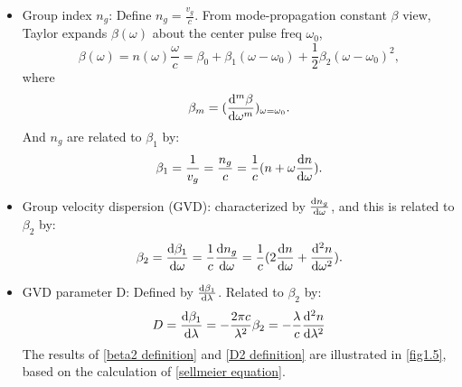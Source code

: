 \documentclass[12pt]{extarticle}
\numberwithin{equation}{section}
\numberwithin{figure}{section}
\numberwithin{table}{section}
\newcommand{\<}{\langle}
\renewcommand{\>}{\rangle}
\theoremstyle{definition}
\begin{document}
\begin{itemize}
                \item Group index $n_g$: Define $n_g = \frac{v_g}{c}$. From mode-propagation constant $\beta$ view, Taylor expands $\beta(\omega)$ about the center pulse freq $\omega_0$, 
                    \begin{equation}
                        \beta(\omega) = n(\omega)\frac{\omega}{c}=\beta_0 + \beta_1(\omega-\omega_0)+\frac{1}{2}\beta_2(\omega-\omega_0)^2,
                        \label{propagation constant expansion}
                    \end{equation}
                    where
                    \begin{equation}
                        \beta_m = (\dv[m]{\beta}{\omega})_{\omega=\omega_0}.
                        \label{betam definition}
                    \end{equation}
                    And $n_g$ are related to $\beta_1$ by:
                    \begin{equation}
                        \beta_1 = \frac{1}{v_g} = \frac{n_g}{c} = \frac{1}{c}(n+\omega \dv{n}{\omega}).
                        \label{group velocity and group index}
                    \end{equation}
                
                \item Group velocity dispersion (GVD): characterized by $\dv{n_g}{\omega}$, and this is related to $\beta_2$ by:
                    \begin{equation}
                        \beta_2 = \dv{\beta_1}{\omega} = \frac{1}{c}\dv{n_g}{\omega} = \frac{1}{c}(2\dv{n}{\omega} +\dv[2]{n}{\omega}).
                        \label{beta2 definition}
                    \end{equation}
                    
                \item GVD parameter D: Defined by $\dv{\beta_1}{\lambda}$. Related to $\beta_2$ by:
                    \begin{equation}
                        D = \dv{\beta_1}{\lambda} = -\frac{2\pi c}{\lambda^2}\beta_2 = -\frac{\lambda}{c}\dv[2]{n}{\lambda}
                        \label{D2 definition}
                    \end{equation}
                     The results of \autoref{beta2 definition} and \autoref{D2 definition} are illustrated in \autoref{fig1.5}, based on the calculation of \autoref{sellmeier equation}.
                     

\end{itemize}
\end{document}
